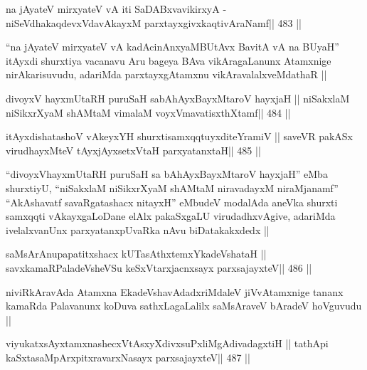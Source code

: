 \begin{shl}
na jAyateV mirxyateV vA iti SaDABxvavikirxyA -
niSeVdhakaqdevxVdavAkayxM parxtayxgivxkaqtivAraNamf\hfill || 483 ||
\end{shl}

\begin{artha}
``na jAyateV mirxyateV vA kadAcinAnxyaMBUtAvx BavitA vA na BUyaH''
  itAyxdi shurxtiya vacanavu Aru bageya BAva vikAragaLanunx Atamxnige
  nirAkarisuvudu, adariMda  parxtayxgAtamxnu vikAravalalxveMdathaR ||
\end{artha}



\begin{shl}
divoyxV hayxmUtaRH puruSaH sabAhAyxBayxMtaroV hayxjaH ||
niSakxlaM niSikxrXyaM shAMtaM vimalaM voyxVmavatisxthXtamf\hfill || 484 ||
\end{shl}

\begin{shl}
itAyxdishatashoV vAkeyxYH shurxtisamxqqtuyxditeYramiV ||
saveVR pakASx virudhayxMteV tAyxjAyxsetxV\s taH parxyatanxtaH\hfill || 485 ||
\end{shl}

\begin{artha}
``divoyxVhayxmUtaRH puruSaH sa bAhAyxBayxMtaroV hayxjaH'' eMba
  shurxtiyU, ``niSakxlaM niSikxrXyaM shAMtaM niravadayxM niraMjanamf''
  ``AkAshavatf savaRgatashacx nitayxH'' eMbudeV modalAda aneVka
  shurxti samxqqti vAkayxgaLoDane elAlx pakaSxgaLU virudadhxvAgive,
  adariMda ivelalxvanUnx parxyatanxpUvaRka nAvu biDatakakxdedx ||
\end{artha}



\begin{shl}
saMsArAnupapatitxshacx kUTasAthxtemxYkadeVshataH ||
savxkamaRPaladeVsheVSu keSxVtarxjacnxsayx parxsajayxteV\hfill || 486 ||
\end{shl}

\begin{artha}
niviRkAravAda Atamxna EkadeVshavAdadxriMdaleV jiVvAtamxnige tananx
kamaRda Palavanunx koDuva sathxLagaLalilx saMsAraveV bAradeV hoVguvudu ||
\end{artha}

\begin{shl}
viyukatxsAyx\s\s tamxnashecxVtAsxyXdivxsuPxliMgAdivadagxtiH ||
tathA\s pi kaSxtasaMpArxpitxravarxNasayx parxsajayxteV\hfill || 487 ||
\end{shl}

